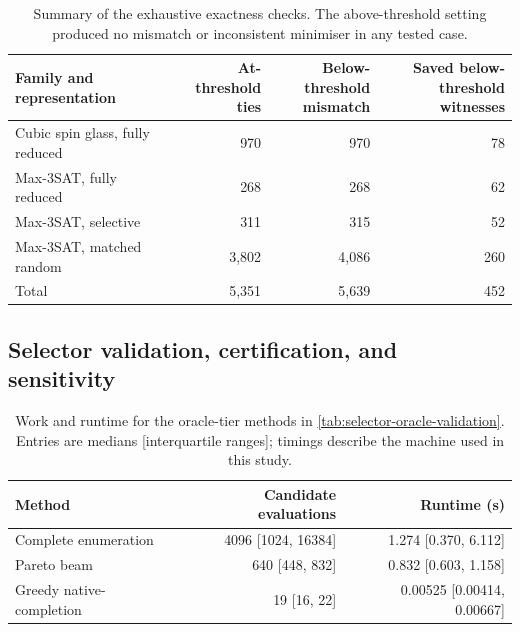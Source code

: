 \documentclass[a4paper,onecolumn,11pt,unpublished]{quantumarticle}
\theoremstyle{remark}
\begin{document}
\begin{table}[!htbp]
    \centering
    \small
    \caption{Summary of the exhaustive exactness checks.  The
    above-threshold setting produced no mismatch or inconsistent minimiser in
    any tested case.}
    \label{tab:e1-exactness-summary}
    \begin{tabular}{@{}lrrr@{}}
        \toprule
        Family and representation
        & \shortstack{At-threshold\\ties}
        & \shortstack{Below-threshold\\mismatch}
        & \shortstack{Saved below-threshold\\witnesses}\\
        \midrule
        Cubic spin glass, fully reduced & 970 & 970 & 78\\
        Max-3SAT, fully reduced          & 268 & 268 & 62\\
        Max-3SAT, selective              & 311 & 315 & 52\\
        Max-3SAT, matched random         & 3,802 & 4,086 & 260\\
        \midrule
        Total                            & 5,351 & 5,639 & 452\\
        \bottomrule
    \end{tabular}
\end{table}

\FloatBarrier
\subsection{Selector validation, certification, and sensitivity}
\label{app:results-selector}

\begin{table}[!htbp]
    \centering
    \small
    \caption{Work and runtime for the oracle-tier methods in
    \cref{tab:selector-oracle-validation}. Entries are medians [interquartile
    ranges]; timings describe the machine used in this study.}
    \label{tab:selector-oracle-work}
    \begin{tabular}{@{}lrr@{}}
        \toprule
        Method & Candidate evaluations & Runtime (s)\\
        \midrule
        Complete enumeration & 4096 [1024, 16384] & 1.274 [0.370, 6.112]\\
        Pareto beam & 640 [448, 832] & 0.832 [0.603, 1.158]\\
        Greedy native-completion & 19 [16, 22] & 0.00525 [0.00414, 0.00667]\\
        \bottomrule
    \end{tabular}
\end{table}
\end{document}
